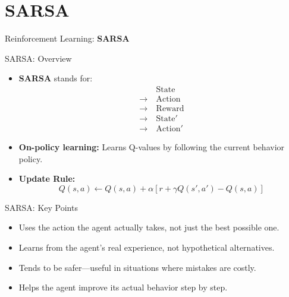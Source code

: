 \section{SARSA}
\begin{frame}{}
    \LARGE Reinforcement Learning: \textbf{SARSA}
\end{frame}

\begin{frame}{SARSA: Overview}
    \begin{itemize}
        \item \textbf{SARSA} stands for:
        \begin{align*}
            &\text{State} \\
            \rightarrow\ &\text{Action} \\
            \rightarrow\ &\text{Reward} \\
            \rightarrow\ &\text{State}' \\
            \rightarrow\ &\text{Action}'
        \end{align*}
        \item \textbf{On-policy learning:} Learns Q-values by following the current behavior policy.
        \item \textbf{Update Rule:}
        \begin{equation*}
            Q(s, a) \leftarrow Q(s, a) + \alpha \left[ r + \gamma Q(s', a') - Q(s, a) \right]
        \end{equation*}
    \end{itemize}
\end{frame}

\begin{frame}{SARSA: Key Points}
    \begin{itemize}
        \item Uses the action the agent actually takes, not just the best possible one.
        \item Learns from the agent's real experience, not hypothetical alternatives.
        \item Tends to be safer—useful in situations where mistakes are costly.
        \item Helps the agent improve its actual behavior step by step.
    \end{itemize}
\end{frame}

